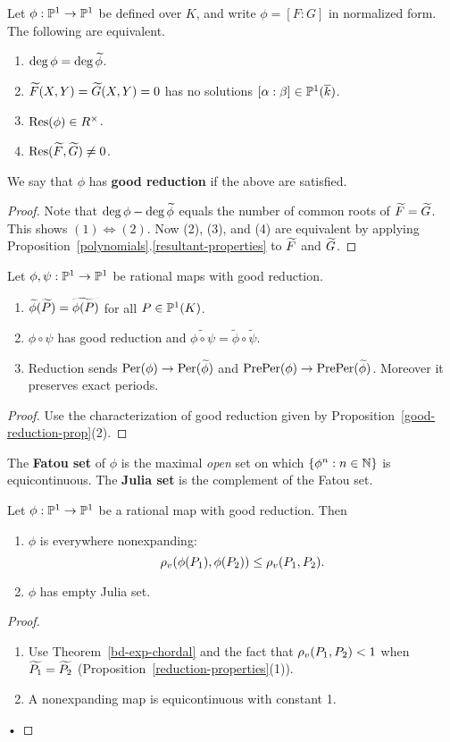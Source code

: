 \begin{pr}\label{good-reduction-prop}
Let $\phi:\mathbb{P}^1\to \mathbb{P}^1$ be defined over $K$, and write $\phi=[F:G]$ in normalized form. The following are equivalent.
\begin{enumerate}
\item
$\deg\phi=\deg\widetilde{\phi}$.
\item
$\widetilde{F}(X,Y)=\widetilde{G}(X,Y)=0$ has no solutions $[\alpha:\beta]\in \mathbb{P}^1(\overline{k})$.
\item $\operatorname{Res}(\phi)\in R^{\times}$.
\item $\operatorname{Res}(\widetilde{F},\widetilde{G})\ne 0$.
\end{enumerate}
We say that $\phi$ has \textbf{good reduction} if the above are satisfied.
\begin{proof}
Note that $\deg\phi-\deg\widetilde{\phi}$ equals the number of common roots of $\widetilde{F}=\widetilde{G}$. This shows $(1)\iff (2)$. Now (2), (3), and (4) are equivalent by applying Proposition~\ref{polynomials}.\ref{resultant-properties} to $\widetilde{F}$ and $\widetilde{G}$.
\end{proof}
\end{pr}
\begin{pr}
Let $\phi,\psi:\mathbb{P}^1\to \mathbb{P}^1$ be rational maps with good reduction.
\begin{enumerate}
\item $\widetilde{\phi}(\widetilde{P})=\widetilde{\phi(P)}$ for all $P\in \mathbb{P}^1(K)$.
\item $\phi\circ\psi$ has good reduction and $\tilde{\phi\circ \psi}=\tilde{\phi}\circ \tilde{\psi}$.
\item Reduction sends $\operatorname{Per}(\phi)\to \operatorname{Per}(\widetilde{\phi})$ and $\operatorname{PrePer}(\phi)\to \operatorname{PrePer}(\widetilde{\phi})$. Moreover it preserves exact periods.
\end{enumerate}
\end{pr}
\begin{proof}
Use the characterization of good reduction given by Proposition~\ref{good-reduction-prop}(2).
\end{proof}
\begin{df}
The \textbf{Fatou set} of $\phi$ is the maximal {\it open} set on which $\left\{{\phi^n}:{n\in \mathbb{N}}\right\}$ is equicontinuous. The \textbf{Julia set} is the complement of the Fatou set.
\end{df}
\begin{thm}
Let $\phi:\mathbb{P}^1\to \mathbb{P}^1$ be a rational map with good reduction. Then
\begin{enumerate}
\item
$\phi$ is everywhere nonexpanding:
\[
\rho_v(\phi(P_1),\phi(P_2))\le \rho_v(P_1,P_2).
\]
\item $\phi$ has empty Julia set.
\end{enumerate}
\end{thm}
\begin{proof}
\begin{enumerate}
\item
Use Theorem~\ref{bd-exp-chordal} and the fact that $\rho_v(P_1,P_2)<1$ when $\widetilde{P_1}=\widetilde{P_2}$ (Proposition~\ref{reduction-properties}(1)).
\item
A nonexpanding map is equicontinuous with constant 1.
\end{enumerate}•
\end{proof}
